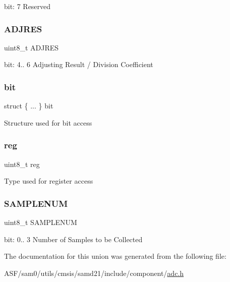 bit\+: 7 Reserved \mbox{\label{union_a_d_c___a_v_g_c_t_r_l___type_a117f1cb5db86253a9d5a76a8dfd3e898}} 
\subsubsection{\texorpdfstring{ADJRES}{ADJRES}}
{\footnotesize\ttfamily uint8\+\_\+t A\+D\+J\+R\+ES}

bit\+: 4.. 6 Adjusting Result / Division Coefficient \mbox{\label{union_a_d_c___a_v_g_c_t_r_l___type_ad81a2b15d9deda80877f820f3c078333}} 
\subsubsection{\texorpdfstring{bit}{bit}}
{\footnotesize\ttfamily struct \{ ... \}   bit}

Structure used for bit access \mbox{\label{union_a_d_c___a_v_g_c_t_r_l___type_a9428adc9af4653a2050e2536b55dec8d}} 
\subsubsection{\texorpdfstring{reg}{reg}}
{\footnotesize\ttfamily uint8\+\_\+t reg}

Type used for register access \mbox{\label{union_a_d_c___a_v_g_c_t_r_l___type_ab231938bef1111d01bae74587f14c984}} 
\subsubsection{\texorpdfstring{SAMPLENUM}{SAMPLENUM}}
{\footnotesize\ttfamily uint8\+\_\+t S\+A\+M\+P\+L\+E\+N\+UM}

bit\+: 0.. 3 Number of Samples to be Collected 

The documentation for this union was generated from the following file\+:\begin{DoxyCompactItemize}
\item 
A\+S\+F/sam0/utils/cmsis/samd21/include/component/\mbox{\hyperlink{component_2adc_8h}{adc.\+h}}\end{DoxyCompactItemize}
